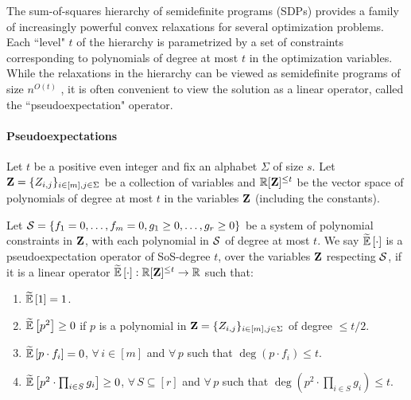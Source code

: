 
The sum-of-squares hierarchy of semidefinite programs (SDPs) provides a family of increasingly
powerful convex relaxations for several optimization problems. 
%
Each ``level" $t$ of the hierarchy is parametrized by a set of constraints corresponding to
polynomials of degree at most $t$ in the optimization variables. While the relaxations in the
hierarchy can be viewed as  semidefinite programs of size $n^{O(t)}$ \cite{BS14, FKP19}, 
it is often convenient to view the solution as a linear operator, called the ``pseudoexpectation" operator.
%


%
%
%
\paragraph{Pseudoexpectations}
 
%
Let $t$ be a positive even integer and fix an alphabet $\Sigma$ of size $s$. Let ${ \mathbf{Z} } = \{Z_{i,j}\}_{i\in[m],j\in\Sigma}$ be a collection of variables and ${\mathbb R}[{ \mathbf{Z} }]^{\leq t}$ be the vector space of polynomials of degree at most $t$ in the variables ${ \mathbf{Z} }$ (including the constants).


\begin{definition}\label{def:constraints_on_sos}
%	 
Let ${\mathcal S} = \left\{f_1 = 0, \ldots, f_m = 0, g_1 \geq 0, \ldots, g_r \geq 0\right\}$ be a system of
polynomial constraints in ${ \mathbf{Z} }$, with each polynomial in ${\mathcal S}$ of degree at most $t$. We say $\tildeEx{\cdot}$ is a pseudoexpectation operator of SoS-degree $t$, over the variables ${ \mathbf{Z} }$  respecting ${\mathcal S}$, if it is a linear operator $ \tildeEx{\cdot}: \R[\zee]^{\leq t} \rightarrow \R$ such that:
	\begin{enumerate}
	\item $\tildeEx{1} = 1$.
    \item $\tildeEx{p^2} \geq 0$ if $p$ is a polynomial in ${ \mathbf{Z} } = \{Z_{i,j}\}_{i\in [m],j\in \Sigma}$ of degree $\leq t/2$.
	\item $\tildeEx{p \cdot f_i} = 0$,  $\forall\, i \in [m]$ and $\forall\, p$ such that $\deg(p \cdot f_i) \leq t$.
	\item $\tildeEx{p^2 \cdot \prod_{i \in S} g_i} \geq 0$, $\forall\, S \subseteq [r]$ and $\forall\, p$ such that $\deg(p^2\cdot \prod_{i \in S} g_i) \leq t$.
	\end{enumerate}
\end{definition}
~


